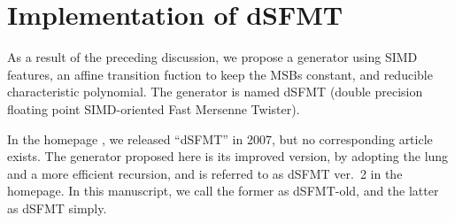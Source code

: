 \documentclass{svmult}
\begin{document}





\section{Implementation of dSFMT}
\label{sec:implement}
As a result of the preceding discussion, 
we propose a generator using SIMD features, an affine transition fuction
to keep the MSBs constant,
and reducible characteristic polynomial. 
The generator is named dSFMT (double precision
floating point SIMD-oriented Fast Mersenne Twister).
\begin{remark}
In the homepage \cite{web:SFMT}, 
we released ``dSFMT'' in 2007,
but no corresponding article exists.
The generator proposed here is its improved version, by
adopting the lung and a more efficient recursion, and 
is referred to as dSFMT ver.\ 2 in the homepage.
In this manuscript, we call the former as dSFMT-old,
and the latter as dSFMT simply.
\end{remark}
\end{document}
